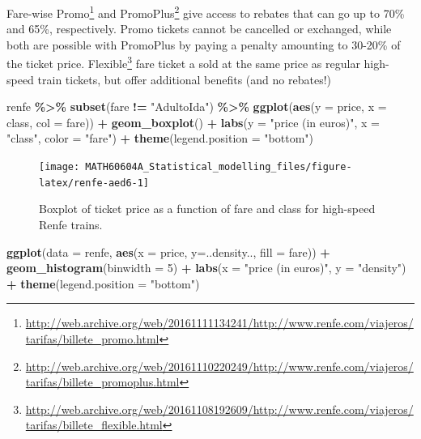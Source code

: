 \documentclass[
  11pt,
  letterpaper,
]{book}
\newenvironment{Shaded}{\begin{snugshade}}{\end{snugshade}}
\newcommand{\DataTypeTok}[1]{\textcolor[rgb]{0.13,0.29,0.53}{#1}}
\newcommand{\DecValTok}[1]{\textcolor[rgb]{0.00,0.00,0.81}{#1}}
\newcommand{\KeywordTok}[1]{\textcolor[rgb]{0.13,0.29,0.53}{\textbf{#1}}}
\newcommand{\NormalTok}[1]{#1}
\newcommand{\OperatorTok}[1]{\textcolor[rgb]{0.81,0.36,0.00}{\textbf{#1}}}
\newcommand{\StringTok}[1]{\textcolor[rgb]{0.31,0.60,0.02}{#1}}
\renewcommand{\href}[2]{#2\footnote{\url{#1}}}
\theoremstyle{definition}
\theoremstyle{definition}
\theoremstyle{definition}
\theoremstyle{remark}
\begin{document}
Fare-wise \href{http://web.archive.org/web/20161111134241/http://www.renfe.com/viajeros/tarifas/billete_promo.html}{Promo} and \href{http://web.archive.org/web/20161110220249/http://www.renfe.com/viajeros/tarifas/billete_promoplus.html}{PromoPlus} give access to rebates that can go up to 70\% and 65\%, respectively. Promo tickets cannot be cancelled or exchanged, while both are possible with PromoPlus by paying a penalty amounting to 30-20\% of the ticket price. \href{http://web.archive.org/web/20161108192609/http://www.renfe.com/viajeros/tarifas/billete_flexible.html}{Flexible} fare ticket a sold at the same price as regular high-speed train tickets, but offer additional benefits (and no rebates!)

\begin{Shaded}
\begin{Highlighting}[]
\NormalTok{renfe }\OperatorTok{\%\textgreater{}\%}\StringTok{ }\KeywordTok{subset}\NormalTok{(fare  }\OperatorTok{!=}\StringTok{ "AdultoIda"}\NormalTok{) }\OperatorTok{\%\textgreater{}\%}
\KeywordTok{ggplot}\NormalTok{(}\KeywordTok{aes}\NormalTok{(}\DataTypeTok{y =}\NormalTok{ price, }\DataTypeTok{x =}\NormalTok{ class, }\DataTypeTok{col =}\NormalTok{ fare)) }\OperatorTok{+}\StringTok{ }
\StringTok{  }\KeywordTok{geom\_boxplot}\NormalTok{() }\OperatorTok{+}\StringTok{ }
\StringTok{  }\KeywordTok{labs}\NormalTok{(}\DataTypeTok{y =} \StringTok{"price (in euros)"}\NormalTok{,}
       \DataTypeTok{x =} \StringTok{"class"}\NormalTok{,}
       \DataTypeTok{color =} \StringTok{"fare"}\NormalTok{) }\OperatorTok{+}
\StringTok{  }\KeywordTok{theme}\NormalTok{(}\DataTypeTok{legend.position =} \StringTok{"bottom"}\NormalTok{)}
\end{Highlighting}
\end{Shaded}

\begin{figure}

{\centering \texttt{[image: MATH60604A\_Statistical\_modelling\_files/figure-latex/renfe-aed6-1]} 

}

\caption{Boxplot of ticket price as a function of fare and class for high-speed Renfe trains.}\label{fig:renfe-aed6}
\end{figure}

\begin{Shaded}
\begin{Highlighting}[]
\KeywordTok{ggplot}\NormalTok{(}\DataTypeTok{data =}\NormalTok{ renfe, }\KeywordTok{aes}\NormalTok{(}\DataTypeTok{x =}\NormalTok{ price, }\DataTypeTok{y=}\NormalTok{..density.., }\DataTypeTok{fill =}\NormalTok{ fare)) }\OperatorTok{+}
\StringTok{    }\KeywordTok{geom\_histogram}\NormalTok{(}\DataTypeTok{binwidth =} \DecValTok{5}\NormalTok{) }\OperatorTok{+}
\StringTok{    }\KeywordTok{labs}\NormalTok{(}\DataTypeTok{x =} \StringTok{"price (in euros)"}\NormalTok{, }\DataTypeTok{y =} \StringTok{"density"}\NormalTok{) }\OperatorTok{+}\StringTok{ }
\StringTok{    }\KeywordTok{theme}\NormalTok{(}\DataTypeTok{legend.position =} \StringTok{"bottom"}\NormalTok{)}
\end{Highlighting}
\end{Shaded}
\end{document}
